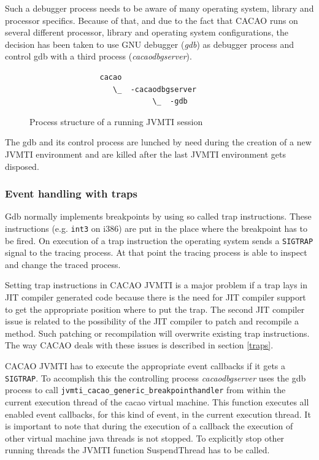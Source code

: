 Such a debugger process needs to be aware of many operating system, library and processor specifics. Because of that, and due to the fact that CACAO runs on several different processor, library and operating system configurations, the decision has been taken to use GNU debugger\cite{gdb} (\textit{gdb}) as debugger process and control gdb with a third process (\textit{cacaodbgserver}).

\begin{figure}[h]
\begin{verbatim}
                cacao 
                   \_  -cacaodbgserver
                            \_  -gdb
\end{verbatim}
\caption{Process structure of a running JVMTI session}
\label{processstructure}
\end{figure}


The gdb and its control process are lunched by need during the creation of a new JVMTI environment and are killed after the last JVMTI environment gets disposed.

\subsubsection{Event handling with traps}
\label{eventhandling}
Gdb normally implements breakpoints by using so called trap instructions. These instructions (e.g. \texttt{int3} on i386) are put in the place where the breakpoint has to be fired. On execution of a trap instruction the operating system sends a \texttt{SIGTRAP} signal to the tracing process. At that point the tracing process is able to inspect and change the traced process.

Setting trap instructions in CACAO JVMTI is a major problem if a trap lays in JIT compiler generated code because there is the need for JIT compiler support to get the appropriate position where to put the trap. The second JIT compiler issue is related to the possibility of the JIT compiler to patch and recompile a method. Such patching or recompilation will overwrite existing trap instructions. The way CACAO deals with these issues is described in section \ref{traps}.

CACAO JVMTI has to execute the appropriate event callbacks if it gets a \texttt{SIGTRAP}. To accomplish this the controlling process \textit{cacaodbgserver} uses the gdb process to call \texttt{jvmti\_cacao\_generic\_breakpointhandler} from within the current execution thread of the cacao virtual machine. This function executes all enabled event callbacks, for this kind of event, in the current execution thread. It is important to note that during the execution of a callback the execution of other virtual machine java threads is not stopped. To explicitly stop other running threads the JVMTI function SuspendThread has to be called.

